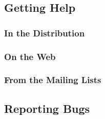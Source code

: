 \subsection{Getting Help}
\label{sec:help}

\subsubsection{In the Distribution}
\missing{}

\subsubsection{On the Web}
\missing{}

\subsubsection{From the Mailing Lists}
\missing{}

\subsection{Reporting Bugs}
\label{sec:bugs}
\missing{}



